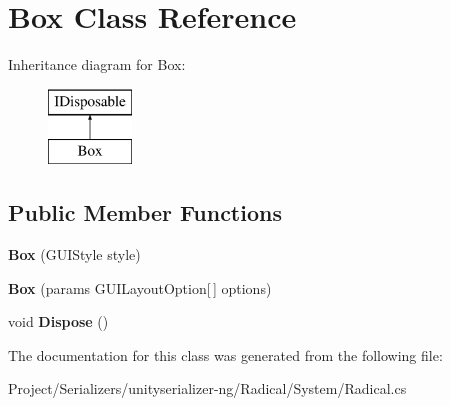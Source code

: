 \hypertarget{class_box}{}\section{Box Class Reference}
\label{class_box}
Inheritance diagram for Box\+:\begin{figure}[H]
\begin{center}
\leavevmode
\includegraphics[height=2.000000cm]{class_box}
\end{center}
\end{figure}
\subsection*{Public Member Functions}
\begin{DoxyCompactItemize}
\item 
\mbox{\label{class_box_ae72544881fa98a2f438f3602dee6c8c5}} 
{\bfseries Box} (G\+U\+I\+Style style)
\item 
\mbox{\label{class_box_a00e3d2864acc9cb2c7cb12eb7bb9734d}} 
{\bfseries Box} (params G\+U\+I\+Layout\+Option\mbox{[}$\,$\mbox{]} options)
\item 
\mbox{\label{class_box_ac9ce247b8a06dc8f0b3bea024ef51956}} 
void {\bfseries Dispose} ()
\end{DoxyCompactItemize}


The documentation for this class was generated from the following file\+:\begin{DoxyCompactItemize}
\item 
Project/\+Serializers/unityserializer-\/ng/\+Radical/\+System/Radical.\+cs\end{DoxyCompactItemize}

